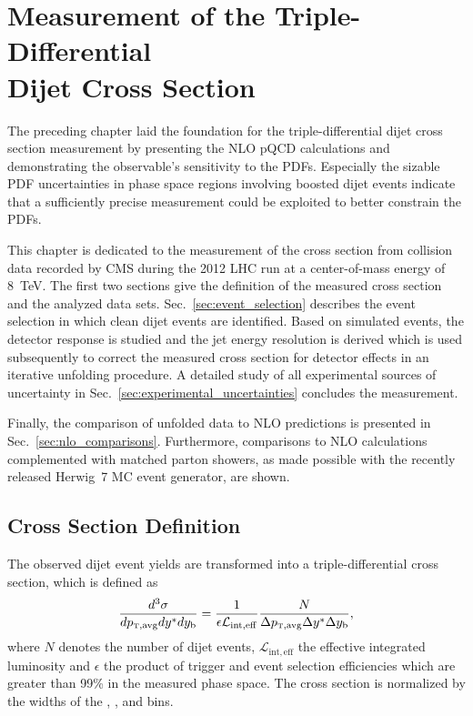 
\chapter[Measurement of the Triple-Differential Dijet Cross Section]{Measurement
of the Triple-Differential\\ Dijet Cross Section}
\label{sec:measurement}

The preceding chapter laid the foundation for the triple-differential dijet
cross section measurement by presenting the NLO pQCD calculations and
demonstrating the observable's sensitivity to the PDFs. Especially the sizable
PDF uncertainties in phase space regions involving boosted dijet events indicate
that a sufficiently precise measurement could be exploited to better constrain
the PDFs. 

This chapter is dedicated to the measurement of the cross section from collision
data recorded by CMS during the 2012 LHC run at a center-of-mass energy of
\SI{8}{\TeV}. The first two sections give the definition of the measured cross
section and the analyzed data sets. Sec.~\ref{sec:event_selection} describes the
event selection in which clean dijet events are identified. Based on simulated
events, the detector response is studied and the jet energy resolution is derived
which is used subsequently to correct the measured cross section for detector
effects in an iterative unfolding procedure. A detailed study of all
experimental sources of uncertainty in Sec.~\ref{sec:experimental_uncertainties}
concludes the measurement.

Finally, the comparison of unfolded data to NLO predictions is presented in
Sec.~\ref{sec:nlo_comparisons}. Furthermore, comparisons to NLO calculations
complemented with matched parton showers, as made possible with the recently
released Herwig~7 MC event generator, are shown.
~

\section{Cross Section Definition}

The observed dijet event yields are transformed into a triple-differential
cross section, which is defined as
%
\begin{equation*}
    \frac{d^3 \sigma}{d \ptavg d \ystar d \yboost} = \frac{1}{\epsilon
        \mathcal{L}_{\mathrm{int, eff}}} \frac{N}{\Delta \ptavg \Delta \ystar
        \Delta \yboost},
\end{equation*}
%
where $N$ denotes the number of dijet events, $\mathcal{L}_{\mathrm{int, eff}}$
the effective integrated luminosity and $\epsilon$ the product of trigger and
event selection efficiencies which are greater than 99\% in the measured phase
space. The cross section is normalized by the widths of the \ptavg, \ystar, and
\yboost bins. 

